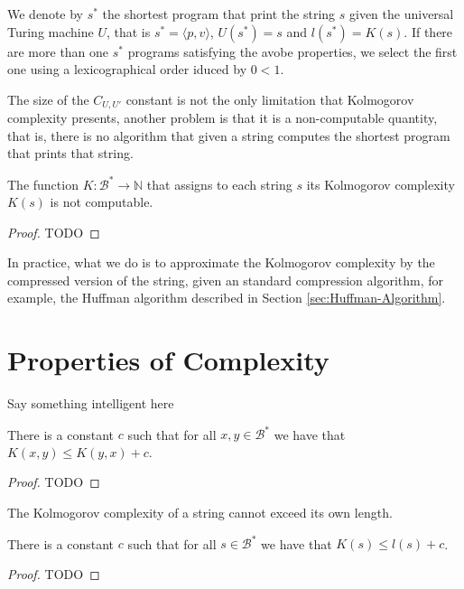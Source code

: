 \begin{notation}
We denote by $s^{\ast}$ the shortest program that print the string $s$ given the universal Turing machine $U$, that is $s^\ast = \langle p,v \rangle$, $U(s^\ast) = s$ and $l(s^\ast) = K(s)$. If there are more than one $s^\ast$ programs satisfying the avobe properties, we select the first one using a lexicographical order iduced by $0 < 1$.
\end{notation}

The size of the $C_{U, U'}$ constant is not the only limitation that Kolmogorov complexity presents, another problem is that it is a non-computable quantity, that is, there is no algorithm that given a string computes the shortest program that prints that string.

\begin{theorem}
The function $K:\mathcal{B}^\ast \rightarrow \mathbb{N}$ that assigns to each string $s$ its Kolmogorov complexity $K(s)$ is not computable.
\end{theorem}
\begin{proof}
{\color{red} TODO}
\end{proof}


In practice, what we do is to approximate the Kolmogorov complexity by the compressed version of the string, given an standard compression algorithm, for example, the Huffman algorithm described in Section \ref{sec:Huffman-Algorithm}.

%
%

\section{Properties of Complexity}

Say something intelligent here


\begin{proposition}
\label{prop:kolmogorov_order}
There is a constant $c$ such that for all $x, y \in\mathcal{B}^{\ast}$ we have that $K(x, y) \leq K(y, x) + c$.
\end{proposition}
\begin{proof}
{\color{red} TODO}
\end{proof}


The Kolmogorov complexity of a string cannot exceed its own length.

\begin{proposition}
\label{prop:kolmogorov_length}
There is a constant $c$ such that for all $s\in\mathcal{B}^{\ast}$ we have that $K(s) \leq l(s)+c$.
\end{proposition}
\begin{proof}
{\color{red} TODO}
\end{proof}

